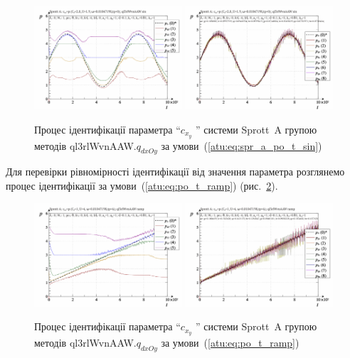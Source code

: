 \begin{figure}[htb!]
  \centerline{
    \includegraphics[width=0.49\textwidth]{p/cha/spr_a/ql3rlWvnAAW_dxOy/sprott_a_id2-p_t_pi_ql3rlWvnAAW_sin.png}
    \hfill
    \includegraphics[width=0.49\textwidth]{p/cha/spr_a/ql3rlWvnAAW_dxOy/sprott_a_id2-p_t_p_ql3rlWvnAAW_sin.png}
  }
\caption{Процес ідентифікації параметра ``$ c_{x_y} $ '' системи Sprott~A групою методів ql3rlWvnAAW.$q_{dxOy} $ за умови~(\ref{atu:eq:spr_a_po_t_sin})}
  \label{atu:f:spr_a_id_ql3rlWvnAAW_q_dxOy_sin}
\end{figure}

Для перевірки рівномірності ідентифікації від
значення параметра розглянемо процес ідентифікації за
умови~(\ref{atu:eq:po_t_ramp}) (рис.~\ref{atu:f:spr_a_id_ql3rlWvnAAW_q_dxOy_ramp}).

\begin{figure}[htb!]
  \centerline{
    \includegraphics[width=0.49\textwidth]{p/cha/spr_a/ql3rlWvnAAW_dxOy/sprott_a_id2-p_t_pi_ql3rlWvnAAW_ramp.png}
    \hfill
    \includegraphics[width=0.49\textwidth]{p/cha/spr_a/ql3rlWvnAAW_dxOy/sprott_a_id2-p_t_p_ql3rlWvnAAW_ramp.png}
  }
\caption{Процес ідентифікації параметра ``$ c_{x_y} $ '' системи Sprott~A групою методів ql3rlWvnAAW.$q_{dxOy} $ за умови~(\ref{atu:eq:po_t_ramp})}
  \label{atu:f:spr_a_id_ql3rlWvnAAW_q_dxOy_ramp}
\end{figure}

